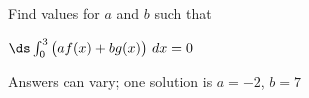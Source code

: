 {Find values for $a$ and $b$ such that 

$\ds \int_0^3 \big(af(x)+bg(x)\big) \ dx=0$
}
{Answers can vary; one solution is $a=-2$, $b=7$
}


